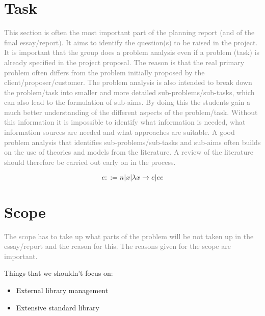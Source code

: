 \documentclass[12pt,a4paper]{article}
\begin{document}
\section{Task}
\textcolor{gray}{
This section is often the most important part of the planning report (and of the final
essay/report). It aims to identify the question(s) to be raised in the project. It is important
that the group does a problem analysis even if a problem (task) is already specified in the
project proposal. The reason is that the real primary problem often differs from the problem
initially proposed by the client/proposer/customer. The problem analysis is also intended to
break down the problem/task into smaller and more detailed sub-problems/sub-tasks, which
can also lead to the formulation of sub-aims. By doing this the students gain a much better
understanding of the different aspects of the problem/task. Without this information it is
impossible to identify what information is needed, what information sources are needed and
what approaches are suitable.
A good problem analysis that identifies sub-problems/sub-tasks and sub-aims often builds
on the use of theories and models from the literature. A review of the literature should
therefore be carried out early on in the process.
}

\begin{equation}
e ::= n | x | \lambda x \rightarrow e | e e 
\end{equation}

\section{Scope}
\textcolor{gray}{
The scope has to take up what parts of the problem will be not taken up in the essay/report
and the reason for this. The reasons given for the scope are important.
}

Things that we shouldn't focus on:
\begin{itemize}
    \item External library management
    \item Extensive standard library
\end{itemize}
\end{document}
